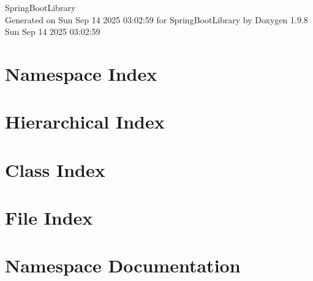 \documentclass[twoside]{book}
\newcommand{\+}{\discretionary{\mbox{\scriptsize$\hookleftarrow$}}{}{}}
\newcommand{\clearemptydoublepage}{%
    \newpage{\pagestyle{empty}\cleardoublepage}%
  }
\begin{document}
  \raggedbottom
    \hypersetup{pageanchor=false,
                bookmarksnumbered=true,
                pdfencoding=unicode
               }
  \begin{titlepage}
  \vspace*{7cm}
  \begin{center}%
  {\Large Spring\+Boot\+Library}\\
  \vspace*{1cm}
  {\large Generated on Sun Sep 14 2025 03\+:02\+:59 for Spring\+Boot\+Library by Doxygen 1.9.8}\\
    \vspace*{0.5cm}
    {\small Sun Sep 14 2025 03:02:59}
  \end{center}
  \end{titlepage}
  \clearemptydoublepage
  \tableofcontents
  \clearemptydoublepage
  \hypersetup{pageanchor=true}
\chapter{Namespace Index}

\chapter{Hierarchical Index}

\chapter{Class Index}

\chapter{File Index}

\chapter{Namespace Documentation}








\end{document}
